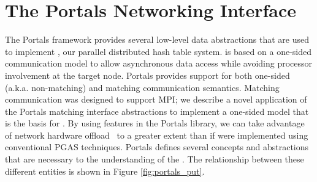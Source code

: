 \vspace{-2mm}

\section{The Portals Networking Interface}







The Portals framework provides several low-level data abstractions that
are used to implement \pdht, our parallel distributed hash table system. \pdht is based on a one-sided
communication model to allow asynchronous data access while avoiding processor
involvement at the target node.  Portals provides support for both
one-sided (a.k.a. non-matching) and matching communication semantics.
Matching communication was designed to support MPI; we describe
a novel application of the Portals matching interface
abstractions to implement a one-sided model that is the basis for
\pdht. By using features in the Portals library,
we can take advantage of network hardware offload~\cite{brightwell:micro:06,bxi} to a greater extent
than if \pdht were implemented using conventional PGAS techniques. Portals defines several concepts
and abstractions that are necessary to the understanding of the
\pdht. The relationship between these different entities is shown in
Figure \ref{fig:portals_put}.

